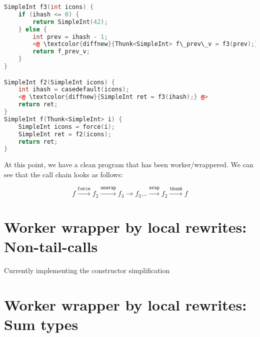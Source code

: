 \documentclass[sigplan,\review anonymous]{acmart}
\begin{document}


{\footnotesize
\begin{lstlisting}[language=c++, caption=taking stock]
SimpleInt f3(int icons) {
    if (ihash <= 0) {
        return SimpleInt(42);
    } else {
        int prev = ihash - 1;
        <@ \textcolor{diffnew}{Thunk<SimpleInt> f\_prev\_v = f3(prev);} @>
        return f_prev_v;
    }
}

SimpleInt f2(SimpleInt icons) {
    int ihash = casedefault(icons);
    <@ \textcolor{diffnew}{SimpleInt ret = f3(ihash);} @>
    return ret;
}
SimpleInt f(Thunk<SimpleInt> i) {
    SimpleInt icons = force(i);
    SimpleInt ret = f2(icons);
    return ret;
}
\end{lstlisting}
}

At this point, we have a clean program that has been worker/wrappered. We can
see that the call chain looks as follows:

$$
f \xrightarrow{\texttt{force}} f_2 \xrightarrow{\texttt{unwrap}} f_3 \to f_3 \dots \xrightarrow{\texttt{wrap}} f_2
\xrightarrow{\texttt{thunk}} f
$$



\section{Worker wrapper by local rewrites: Non-tail-calls}

Currently implementing the constructor simplification

\section{Worker wrapper by local rewrites: Sum types}
\end{document}
